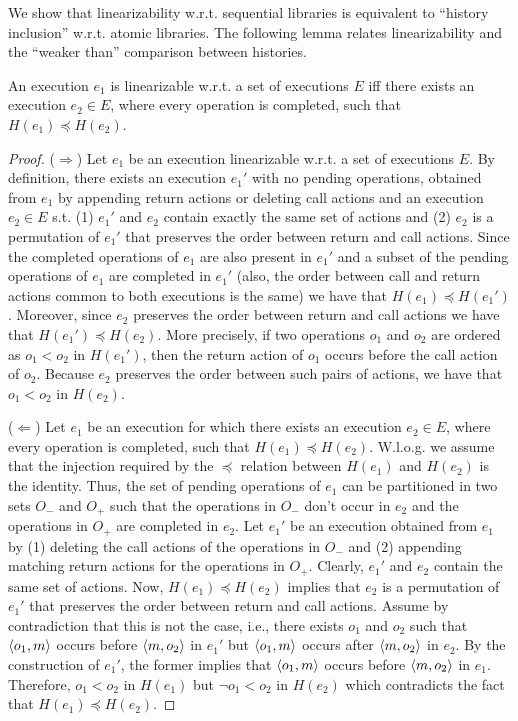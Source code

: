 We show that linearizability w.r.t. sequential libraries is equivalent to ``history inclusion'' w.r.t. atomic libraries.
The following lemma relates linearizability and the ``weaker than'' comparison between histories.

\begin{lemma}
  \label{prop:lin}

  An execution $e_1$ is linearizable w.r.t. a set of executions $E$ iff there exists an
  execution $e_2\in E$, where every operation is completed, such that
  $H(e_1)\preceq H(e_2)$.

\end{lemma}

\begin{proof}

($\Rightarrow$) Let $e_1$ be an execution linearizable w.r.t. a set of executions $E$. By definition,
there exists an execution $e_1'$ with no pending operations, obtained from $e_1$ by appending 
return actions or deleting call actions and an execution $e_2\in E$ s.t. (1) $e_1'$ and $e_2$ contain exactly
the same set of actions and (2) $e_2$ is a permutation of $e_1'$ that preserves the order between 
return and call actions. 
Since the completed operations of $e_1$ are also present in $e_1'$ and a subset of the pending operations of $e_1$
are completed in $e_1'$ (also, the order between call and return actions common to both executions is the same)
we have that $H(e_1)\preceq H(e_1')$. Moreover, since $e_2$ preserves the order between return and call actions
we have that $H(e_1')\preceq H(e_2)$. More precisely, if two operations $o_1$ and $o_2$ are ordered as $o_1<o_2$ in $H(e_1')$,
then the return action of $o_1$ occurs before the call action of $o_2$. Because $e_2$ preserves the order between such pairs
of actions, we have that $o_1<o_2$ in $H(e_2)$.

($\Leftarrow$) Let $e_1$ be an execution for which there exists an
  execution $e_2\in E$, where every operation is completed, such that
  $H(e_1)\preceq H(e_2)$. W.l.o.g. we assume that the injection required by the $\preceq$ relation
  between $H(e_1)$ and $H(e_2)$ is the identity.
  Thus, the set of pending operations of $e_1$ can be partitioned in 
  two sets $O_{-}$ and $O_{+}$ such that the operations in $O_{-}$ don't occur in $e_2$ and the operations in 
  $O_{+}$ are completed in $e_2$. Let $e_1'$ be an execution obtained from $e_1$ by 
  (1) deleting the call actions of the operations in $O_{-}$
  and (2) appending matching return actions for the operations in $O_+$. 
  Clearly, $e_1'$ and $e_2$ contain the same set of actions. Now, $H(e_1)\preceq H(e_2)$ implies that 
  $e_2$ is a permutation of $e_1'$ that preserves the order between return and call actions. Assume by contradiction
  that this is not the case, i.e., there exists $o_1$ and $o_2$ such that $\left\langle {o_1,m} \right\rangle$ occurs before $\left\langle {m,o_2} \right\rangle$ in $e_1'$ 
  but $\left\langle {o_1,m} \right\rangle$ occurs after $\left\langle {m,o_2} \right\rangle$ in $e_2$. By the construction of $e_1'$, the former implies that 
  $\left\langle {o_1,m} \right\rangle$ occurs before $\left\langle {m,o_2} \right\rangle$ in $e_1$. Therefore, $o_1<o_2$ in $H(e_1)$ but $\neg o_1<o_2$ in $H(e_2)$
  which contradicts the fact that $H(e_1)\preceq H(e_2)$.
 
\end{proof}

